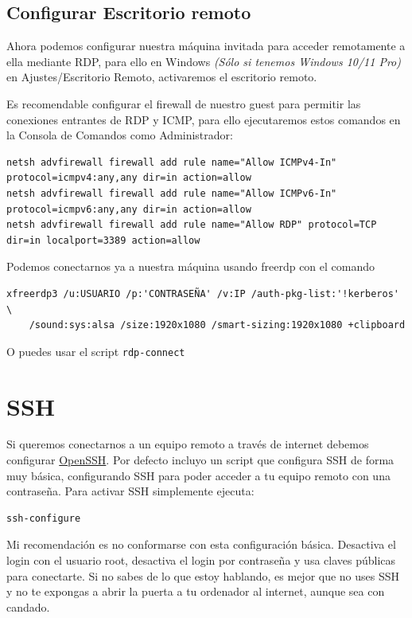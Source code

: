 \documentclass[11pt]{article}
\begin{document}
\subsection{Configurar Escritorio remoto}

Ahora podemos configurar nuestra máquina invitada para acceder remotamente a ella mediante RDP, para ello en Windows \emph{(Sólo si tenemos Windows 10/11 Pro)} en Ajustes/Escritorio Remoto, activaremos el escritorio remoto.

Es recomendable configurar el firewall de nuestro guest para permitir las conexiones entrantes de RDP y ICMP, para ello ejecutaremos estos comandos en la Consola de Comandos como Administrador:

\begin{lstlisting}[basicstyle=\tiny\ttfamily]
netsh advfirewall firewall add rule name="Allow ICMPv4-In" protocol=icmpv4:any,any dir=in action=allow
netsh advfirewall firewall add rule name="Allow ICMPv6-In" protocol=icmpv6:any,any dir=in action=allow
netsh advfirewall firewall add rule name="Allow RDP" protocol=TCP dir=in localport=3389 action=allow
\end{lstlisting}

Podemos conectarnos ya a nuestra máquina usando freerdp con el comando

\begin{lstlisting}[basicstyle=\small\ttfamily]
xfreerdp3 /u:USUARIO /p:'CONTRASEÑA' /v:IP /auth-pkg-list:'!kerberos' \
	/sound:sys:alsa /size:1920x1080 /smart-sizing:1920x1080 +clipboard
\end{lstlisting}

O puedes usar el script \texttt{rdp-connect}

\section{SSH}

Si queremos conectarnos a un equipo remoto a través de internet debemos configurar \href{https://es.wikipedia.org/wiki/OpenSSH}{OpenSSH}. Por defecto incluyo un script que configura SSH de forma muy básica, configurando SSH para poder acceder a tu equipo remoto con una contraseña. Para activar SSH simplemente ejecuta:

\begin{verbatim}
ssh-configure
\end{verbatim}

Mi recomendación es no conformarse con esta configuración básica. Desactiva el login con el usuario root, desactiva el login por contraseña y usa claves públicas para conectarte. Si no sabes de lo que estoy hablando, es mejor que no uses SSH y no te expongas a abrir la puerta a tu ordenador al internet, aunque sea con candado.
\end{document}
